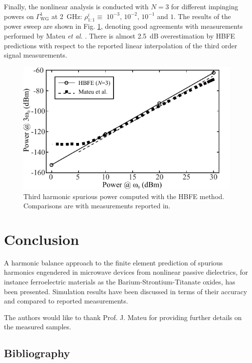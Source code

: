 \documentclass[AMA,STIX2COL]{WileyNJD-v2}
\begin{document}
Finally, the nonlinear analysis is conducted with $N=3$ for different impinging powers on $\Gamma^1_\text{WG}$ at 2~GHz: $\rho^i_{1:1} \equiv$ $10^{-3}$, $10^{-2}$,  $10^{-1}$ and $1$.  
The results of the power sweep are shown in Fig. \ref{fig:third_harm}, denoting good agreements with measurements performed by Mateu \textit{et al.} \cite{mateu2006measurements}. There is almost 2.5~dB overestimation by HBFE predictions with respect to the reported linear interpolation of the third order signal measurements.
%
\begin{figure}[ht!]
\centering
\includegraphics[width=\columnwidth]{third_harm}
\caption{Third harmonic spurious power computed with the HBFE method. Comparisons are with measurements reported in\cite{mateu2006measurements}.}
\label{fig:third_harm}
\end{figure}
%

\section{Conclusion}
A harmonic balance approach to the finite element prediction of spurious harmonics engendered in microwave devices from nonlinear passive dielectrics, for instance ferroelectric materials as the Barium-Strontium-Titanate oxides, has been presented. Simulation results have been discussed in terms of their accuracy and compared to reported measurements.

\ack
The authors would like to thank Prof. J. Mateu for providing further details on the measured samples.


\subsection{Bibliography}
\nocite{*}%
%
\end{document}
